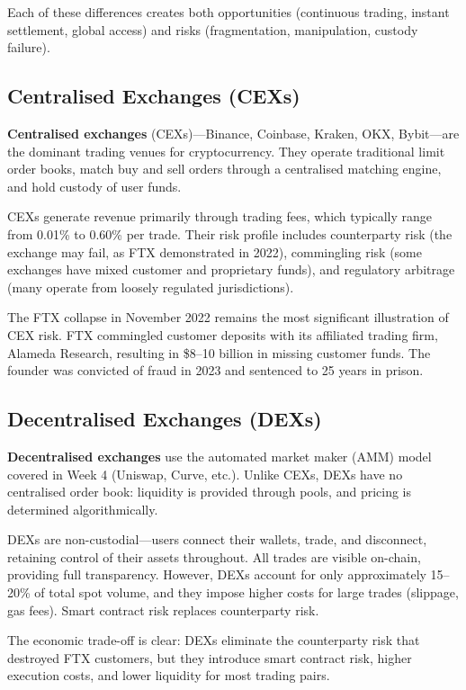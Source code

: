 \documentclass[11pt,a4paper]{article}
\newcommand{\keyword}[1]{\textbf{\textcolor{AccentOrange}{#1}}}
\begin{document}
Each of these differences creates both opportunities (continuous trading, instant settlement, global access) and risks (fragmentation, manipulation, custody failure).

\subsection{Centralised Exchanges (CEXs)}

\keyword{Centralised exchanges} (CEXs)---Binance, Coinbase, Kraken, OKX, Bybit---are the dominant trading venues for cryptocurrency. They operate traditional limit order books, match buy and sell orders through a centralised matching engine, and hold custody of user funds.

CEXs generate revenue primarily through trading fees, which typically range from 0.01\% to 0.60\% per trade. Their risk profile includes counterparty risk (the exchange may fail, as FTX demonstrated in 2022), commingling risk (some exchanges have mixed customer and proprietary funds), and regulatory arbitrage (many operate from loosely regulated jurisdictions).

The FTX collapse in November 2022 remains the most significant illustration of CEX risk. FTX commingled customer deposits with its affiliated trading firm, Alameda Research, resulting in \$8--10 billion in missing customer funds. The founder was convicted of fraud in 2023 and sentenced to 25 years in prison.

\subsection{Decentralised Exchanges (DEXs)}

\keyword{Decentralised exchanges} use the automated market maker (AMM) model covered in Week 4 (Uniswap, Curve, etc.). Unlike CEXs, DEXs have no centralised order book: liquidity is provided through pools, and pricing is determined algorithmically.

DEXs are non-custodial---users connect their wallets, trade, and disconnect, retaining control of their assets throughout. All trades are visible on-chain, providing full transparency. However, DEXs account for only approximately 15--20\% of total spot volume, and they impose higher costs for large trades (slippage, gas fees). Smart contract risk replaces counterparty risk.

The economic trade-off is clear: DEXs eliminate the counterparty risk that destroyed FTX customers, but they introduce smart contract risk, higher execution costs, and lower liquidity for most trading pairs.
\end{document}
